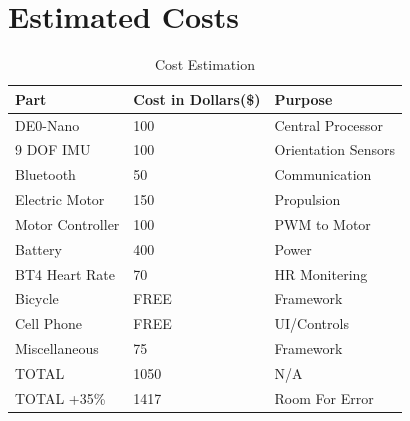 \documentclass[12pt,article]{IEEEtran}
\begin{document}
\section{\bfseries Estimated Costs}
    \begin{table}[H]
        \renewcommand{\arraystretch}{1.3}
            \caption{Cost Estimation}
            
            \label{Team Hour Summary}
            
            \centering
            \begin{tabular}{p{3cm}|p{1.5cm}|p{3cm}}
            \hline
            \bfseries   Part                & \bfseries Cost in Dollars(\$) & \bfseries Purpose     \\
            \hline\hline
                        DE0-Nano            & 100                           &   Central Processor   \\
                        9 DOF IMU           & 100                           &   Orientation Sensors \\  
                        Bluetooth           & 50                            &   Communication       \\  
                        Electric Motor      & 150                           &   Propulsion          \\
                        Motor Controller    & 100                           &   PWM to Motor        \\
                        Battery             & 400                           &   Power               \\  
                        BT4 Heart Rate      & 70                            &   HR Monitering       \\  
                        Bicycle             & FREE                          &   Framework           \\
                        Cell Phone          & FREE                          &   UI/Controls         \\
                        Miscellaneous       & 75                            &   Framework           \\
                        TOTAL               & 1050                          &   N/A                 \\        
                        \hline
                        TOTAL +35\%         & 1417                          &   Room For Error      \\        
                        \hline
            \end{tabular}
        \end{table}



\end{document}
